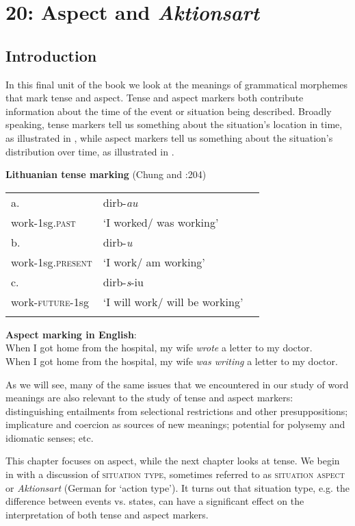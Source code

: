 \chapter{{20}: Aspect and \textit{Aktionsart}}

\section{Introduction}\label{sec:} %

In this final unit of the book we look at the meanings of grammatical morphemes that mark tense and aspect. Tense and aspect markers both contribute information about the time of the event or situation being described. Broadly speaking, tense markers tell us something about the situation’s location in time, as illustrated in , while aspect markers tell us something about the situation’s distribution over time, as illustrated in . 


\textbf{Lithuanian tense marking} (Chung and \citealt{Timberlake1985}:204)

\begin{tabularx}{\textwidth}{XXX}
\lsptoprule
a. & dirb-\textit{au}\\
work-1sg\textsc{.past} & ‘I worked/ was working’\\
b. & dirb-\textit{u}\\
work-1sg\textsc{.present} & ‘I work/ am working’\\
c. & dirb-\textit{s}-iu\\
work-\textsc{future-}1sg & ‘I will work/ will be working’\\
\lspbottomrule
\end{tabularx}
\ea
\textbf{Aspect marking in English}:\\
\ea When I got home from the hospital, my wife \textit{wrote} a letter to my doctor.\\
                       \z
\ex When I got home from the hospital, my wife \textit{was writing} a letter to my doctor.
\z


As we will see, many of the same issues that we encountered in our study of word meanings are also relevant to the study of tense and aspect markers: distinguishing entailments from selectional restrictions and other presuppositions; implicature and coercion as sources of new meanings; potential for polysemy and idiomatic senses; etc.



This chapter focuses on aspect, while the next chapter looks at tense. We begin in  with a discussion of \textsc{situation type}, sometimes referred to as \textsc{situation aspect} or \textit{Aktionsart} (German for ‘action type’). It turns out that situation type, e.g. the difference between events vs. states, can have a significant effect on the interpretation of both tense and aspect markers.



